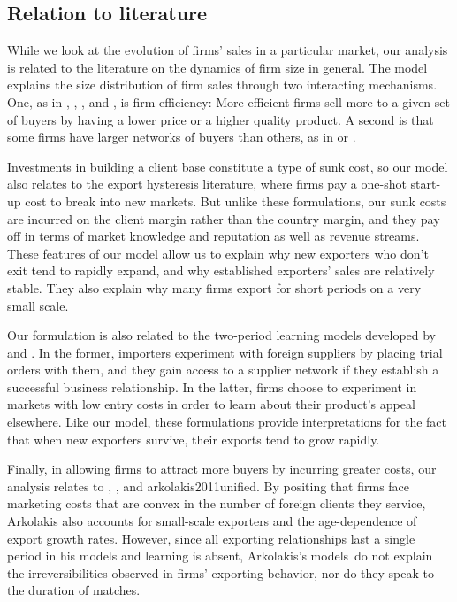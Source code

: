 \documentclass[12pt,titlepage]{article}
\renewcommand{\baselinestretch}{2}
\begin{document}
\subsection{Relation to literature}

While we look at the evolution of firms' sales in a particular market, our
analysis is related to the literature on the dynamics of firm size in
general. The model explains the size distribution of firm sales through two
interacting mechanisms. One, as in \citet{melitz2003impact}, \citet{bernard2003plants},
\citet{luttmer2007selection}, and \citet{irarrazabal2006hysteresis}, is firm efficiency:
More efficient firms sell more to a given set of buyers by having a lower
price or a higher quality product. A second is that some firms have larger
networks of buyers than others, as in \citet{JacksonRogers07} or \citet{Chaney11}.

Investments in building a client base constitute a type of sunk cost, so our
model also relates to the export hysteresis literature, where firms pay a one-shot start-up cost to break into new markets.\citep{baldwin1989persistent, das2007market, dixit1989hysteresis, alessandria2007sunk, alessandria2010inventories}  But unlike these formulations, our sunk costs are incurred
on the client margin rather than the country margin, and they pay off in
terms of market knowledge and reputation as well as revenue streams. These
features of our model allow us to explain why new exporters who don't exit
tend to rapidly expand, and why established exporters' sales are relatively
stable. They also explain why many firms export for short periods on a very
small scale.

Our formulation is also related to the two-period learning models developed
by \citet{rauch2003starting} and \citet{albornoz2012sequential}. In the former,
importers experiment with foreign suppliers by placing trial orders with
them, and they gain access to a supplier network if they establish a
successful business relationship. In the latter, firms choose to experiment
in markets with low entry costs in order to learn about their product's
appeal elsewhere. Like our model, these formulations provide interpretations
for the fact that when new exporters survive, their exports tend to grow
rapidly.\renewcommand{\baselinestretch}{1}\footnotemark{}

Finally, in allowing firms to attract more buyers by incurring greater
costs, our analysis relates to \citet{drozd2012understanding}, \citet{arkolakis2010market}, and {arkolakis2011unified}. By positing that firms face marketing costs that are convex in the
number of foreign clients they service, Arkolakis also accounts for
small-scale exporters and the age-dependence of export growth rates.
However, since all exporting relationships last a single period in his
models and learning is absent, Arkolakis's models\ do not explain the
irreversibilities observed in firms' exporting behavior, nor do they speak
to the duration of matches.
\end{document}
